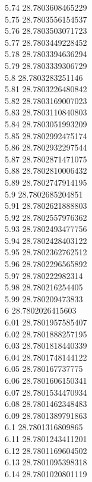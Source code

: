 {5.74	28.7803608465229\\
5.75	28.7803556154537\\
5.76	28.7803503071723\\
5.77	28.7803449228452\\
5.78	28.7803394636294\\
5.79	28.7803339306729\\
5.8	28.7803283251146\\
5.81	28.7803226480842\\
5.82	28.7803169007023\\
5.83	28.7803110840803\\
5.84	28.7803051993209\\
5.85	28.7802992475174\\
5.86	28.7802932297544\\
5.87	28.7802871471075\\
5.88	28.7802810006432\\
5.89	28.7802747914195\\
5.9	28.7802685204851\\
5.91	28.7802621888803\\
5.92	28.7802557976362\\
5.93	28.7802493477756\\
5.94	28.7802428403122\\
5.95	28.7802362762512\\
5.96	28.7802296565892\\
5.97	28.780222982314\\
5.98	28.780216254405\\
5.99	28.780209473833\\
6	28.7802026415603\\
6.01	28.7801957585407\\
6.02	28.7801888257195\\
6.03	28.7801818440339\\
6.04	28.7801748144122\\
6.05	28.780167737775\\
6.06	28.7801606150341\\
6.07	28.7801534470934\\
6.08	28.7801462348483\\
6.09	28.7801389791863\\
6.1	28.7801316809865\\
6.11	28.7801243411201\\
6.12	28.7801169604502\\
6.13	28.7801095398318\\
6.14	28.7801020801119\\
}
